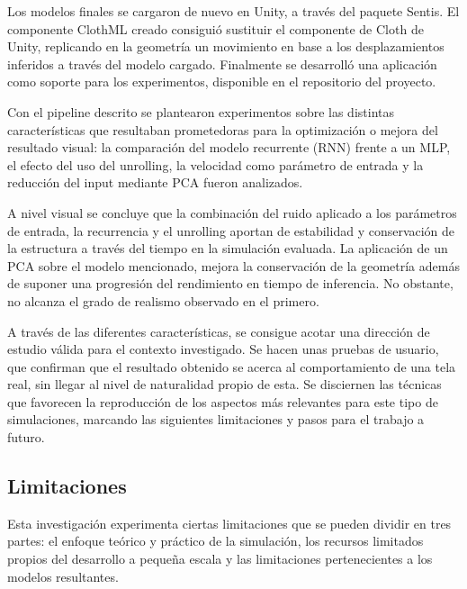 Los modelos finales se cargaron de nuevo en Unity, a través del paquete Sentis. El componente ClothML creado consiguió sustituir el componente de Cloth de Unity, replicando en la geometría un movimiento en base a los desplazamientos inferidos a través del modelo cargado. Finalmente se desarrolló una aplicación como soporte para los experimentos, disponible en el repositorio del proyecto. \newline

Con el pipeline descrito se plantearon experimentos sobre las distintas características que resultaban prometedoras para la optimización o mejora del resultado visual: la comparación del modelo recurrente (RNN) frente a un MLP, el efecto del uso del unrolling, la velocidad como parámetro de entrada y la reducción del input mediante PCA fueron analizados. \newline

A nivel visual se concluye que la combinación del ruido aplicado a los parámetros de entrada, la recurrencia y el unrolling aportan de estabilidad y conservación de la estructura a través del tiempo en la simulación evaluada. La aplicación de un PCA sobre el modelo mencionado, mejora la conservación de la geometría además de suponer una progresión del rendimiento en tiempo de inferencia. No obstante, no alcanza el grado de realismo observado en el primero. \newline

A través de las diferentes características, se consigue acotar una dirección de estudio válida para el contexto investigado. Se hacen unas pruebas de usuario, que confirman que el resultado obtenido se acerca al comportamiento de una tela real, sin llegar al nivel de naturalidad propio de esta. Se disciernen las técnicas que favorecen la reproducción de los aspectos más relevantes para este tipo de simulaciones, marcando las siguientes limitaciones y pasos para el trabajo a futuro. 

\subsection{Limitaciones}
Esta investigación experimenta ciertas limitaciones que se pueden  dividir en tres partes: el enfoque teórico y práctico de la simulación, los recursos limitados propios del desarrollo a pequeña escala y las limitaciones pertenecientes a los modelos resultantes.\newline

